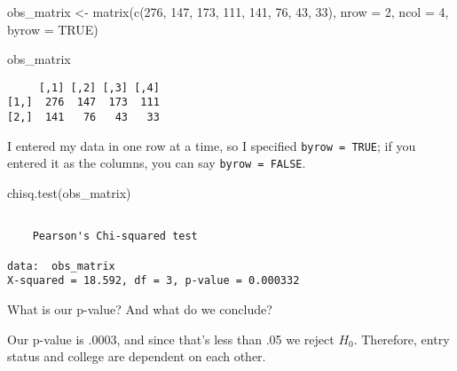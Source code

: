\documentclass[
  letterpaper,
  DIV=11,
  numbers=noendperiod]{scrartcl}
\newenvironment{Shaded}{\begin{snugshade}}{\end{snugshade}}
\newcommand{\AttributeTok}[1]{\textcolor[rgb]{0.40,0.45,0.13}{#1}}
\newcommand{\ConstantTok}[1]{\textcolor[rgb]{0.56,0.35,0.01}{#1}}
\newcommand{\DecValTok}[1]{\textcolor[rgb]{0.68,0.00,0.00}{#1}}
\newcommand{\FunctionTok}[1]{\textcolor[rgb]{0.28,0.35,0.67}{#1}}
\newcommand{\NormalTok}[1]{\textcolor[rgb]{0.00,0.23,0.31}{#1}}
\newcommand{\OtherTok}[1]{\textcolor[rgb]{0.00,0.23,0.31}{#1}}
\begin{document}
\begin{Shaded}
\begin{Highlighting}[]
\NormalTok{obs\_matrix }\OtherTok{\textless{}{-}} \FunctionTok{matrix}\NormalTok{(}\FunctionTok{c}\NormalTok{(}\DecValTok{276}\NormalTok{, }\DecValTok{147}\NormalTok{, }\DecValTok{173}\NormalTok{, }\DecValTok{111}\NormalTok{, }\DecValTok{141}\NormalTok{,}
                      \DecValTok{76}\NormalTok{, }\DecValTok{43}\NormalTok{, }\DecValTok{33}\NormalTok{),}
                    \AttributeTok{nrow =} \DecValTok{2}\NormalTok{, }\AttributeTok{ncol =} \DecValTok{4}\NormalTok{,}
                    \AttributeTok{byrow =} \ConstantTok{TRUE}\NormalTok{)}

\NormalTok{obs\_matrix}
\end{Highlighting}
\end{Shaded}

\begin{verbatim}
     [,1] [,2] [,3] [,4]
[1,]  276  147  173  111
[2,]  141   76   43   33
\end{verbatim}

I entered my data in one row at a time, so I specified
\texttt{byrow\ =\ TRUE}; if you entered it as the columns, you can say
\texttt{byrow\ =\ FALSE}.

\begin{Shaded}
\begin{Highlighting}[]
\FunctionTok{chisq.test}\NormalTok{(obs\_matrix)}
\end{Highlighting}
\end{Shaded}

\begin{verbatim}

    Pearson's Chi-squared test

data:  obs_matrix
X-squared = 18.592, df = 3, p-value = 0.000332
\end{verbatim}

What is our p-value? And what do we conclude?

Our p-value is .0003, and since that's less than .05 we reject \(H_0\).
Therefore, entry status and college are dependent on each other.
\end{document}
